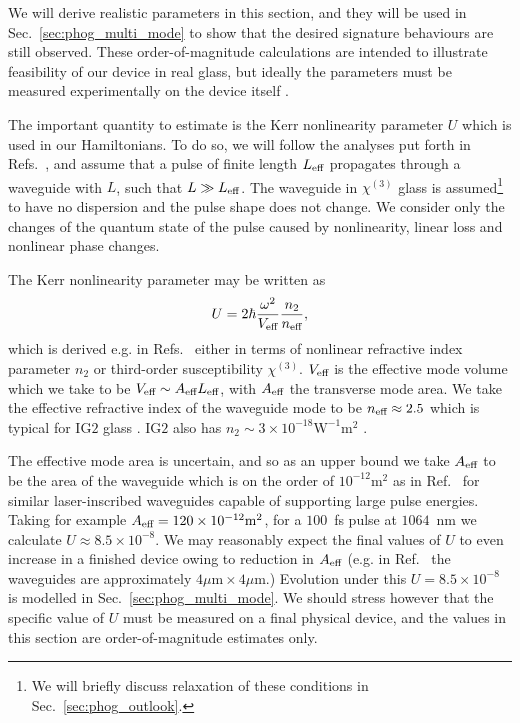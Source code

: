 We will derive realistic parameters in this section, and they will be used in Sec.~\ref{sec:phog_multi_mode} to show that the desired signature behaviours are still observed. These order-of-magnitude calculations are intended to illustrate feasibility of our device in real glass, but ideally the parameters must be measured experimentally on the device itself \cite{Wang2014}.

The important quantity to estimate is the Kerr nonlinearity parameter $U$ which is used in our Hamiltonians. To do so, we will follow the analyses put forth in Refs.~\cite{Drummond1980, Imoto1985, Kitagawa1986}, and assume that a pulse of finite length $L_{\text{eff}}$ propagates through a waveguide with $L$, such that $L \gg L_{\text{eff}}$. The waveguide in $\chi^{\left(3\right)}$ glass is assumed\footnote{We will briefly discuss relaxation of these conditions in Sec.~\ref{sec:phog_outlook}.} to have no dispersion and the pulse shape does not change. We consider only the changes of the quantum state of the pulse caused by nonlinearity, linear loss and nonlinear phase changes. 

The Kerr nonlinearity parameter may be written as 
\begin{equation}
U = 2 \hbar \frac{\omega^2}{V_{\text{eff}}} \frac{n_2}{n_{\text{eff}}},
\end{equation}
which is derived e.g. in Refs.~\cite{Imoto1985, Kitagawa1986, Drummond1980} either in terms of nonlinear refractive index parameter $n_2$ or third-order susceptibility $\chi^{\left(3\right)}$. $V_{\text{eff}}$ is the effective mode volume which we take to be $V_{\text{eff}} \sim A_{\text{eff}} L_{\text{eff}}$, with $A_{\text{eff}}$ the transverse mode area. We take the effective refractive index of the waveguide mode to be $n_{\text{eff}} \approx 2.5$ which is typical for IG$2$ glass \cite{ig2}. IG$2$ also has $n_2 \sim 3 \times 10^{-18} \text{W}^{-1} \text{m}^2$ \cite{Demetriou2017, Wang2014}. %

The effective mode area is uncertain, and so as an upper bound we take $A_{\text{eff}}$ to be the area of the waveguide which is on the order of $10^{-12}\text{m}^2$ as in Ref.~\cite{Mukherjee2017} for similar laser-inscribed waveguides  capable of supporting large pulse energies. Taking for example $A_{\text{eff}} = 120\times10^{-12} \text{m}^2$, for a $100$~fs pulse at $1064$~nm we calculate $U \approx 8.5\times 10^{-8}$. We may reasonably expect the final values of $U$ to even increase in a finished device owing to reduction in $A_{\text{eff}}$ (e.g. in Ref.~\cite{Mukherjee2017} the waveguides are approximately $4 \mu\text{m} \times 4 \mu\text{m}$.) Evolution under this $U = 8.5\times10^{-8}$ is modelled in Sec.~\ref{sec:phog_multi_mode}. We should stress however that the specific value of $U$ must be measured on a final physical device, and the values in this section are order-of-magnitude estimates only.

